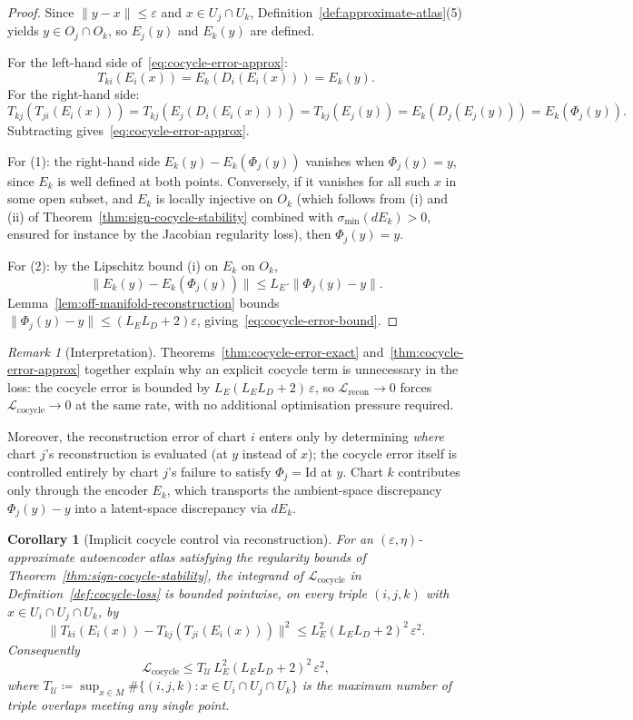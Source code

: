 \documentclass[11pt]{article}
\theoremstyle{plain}
\newtheorem{corollary}[theorem]{Corollary}
\theoremstyle{definition}
\theoremstyle{remark}
\newtheorem{remark}[theorem]{Remark}
\begin{document}
\begin{proof}
Since $\|y - x\| \leq \varepsilon$ and $x \in U_j \cap U_k$, Definition~\ref{def:approximate-atlas}(5) yields $y \in O_j \cap O_k$, so $E_j(y)$ and $E_k(y)$ are defined.

For the left-hand side of~\eqref{eq:cocycle-error-approx}:
\[
T_{ki}(E_i(x)) = E_k(D_i(E_i(x))) = E_k(y).
\]
For the right-hand side:
\[
T_{kj}(T_{ji}(E_i(x))) = T_{kj}(E_j(D_i(E_i(x)))) = T_{kj}(E_j(y)) = E_k(D_j(E_j(y))) = E_k(\Phi_j(y)).
\]
Subtracting gives~\eqref{eq:cocycle-error-approx}.

For (1): the right-hand side $E_k(y) - E_k(\Phi_j(y))$ vanishes when $\Phi_j(y) = y$, since $E_k$ is well defined at both points. Conversely, if it vanishes for all such $x$ in some open subset, and $E_k$ is locally injective on $O_k$ (which follows from (i) and (ii) of Theorem~\ref{thm:sign-cocycle-stability} combined with $\sigma_{\min}(d E_k) > 0$, ensured for instance by the Jacobian regularity loss), then $\Phi_j(y) = y$.

For (2): by the Lipschitz bound (i) on $E_k$ on $O_k$,
\[
\|E_k(y) - E_k(\Phi_j(y))\| \leq L_E \cdot \|\Phi_j(y) - y\|.
\]
Lemma~\ref{lem:off-manifold-reconstruction} bounds $\|\Phi_j(y) - y\| \leq (L_E L_D + 2)\varepsilon$, giving~\eqref{eq:cocycle-error-bound}.
\end{proof}

\begin{remark}[Interpretation]\label{rem:cocycle-interpretation}
Theorems~\ref{thm:cocycle-error-exact} and~\ref{thm:cocycle-error-approx} together explain why an explicit cocycle term is unnecessary in the loss: the cocycle error is bounded by $L_E (L_E L_D + 2)\,\varepsilon$, so $\mathcal{L}_{\mathrm{recon}} \to 0$ forces $\mathcal{L}_{\mathrm{cocycle}} \to 0$ at the same rate, with no additional optimisation pressure required.

Moreover, the reconstruction error of chart $i$ enters only by determining \emph{where} chart $j$'s reconstruction is evaluated (at $y$ instead of $x$); the cocycle error itself is controlled entirely by chart $j$'s failure to satisfy $\Phi_j = \mathrm{Id}$ at $y$. Chart $k$ contributes only through the encoder $E_k$, which transports the ambient-space discrepancy $\Phi_j(y) - y$ into a latent-space discrepancy via $d E_k$.
\end{remark}
\begin{corollary}[Implicit cocycle control via reconstruction]\label{cor:cocycle-from-recon}
For an $(\varepsilon, \eta)$-approximate autoencoder atlas satisfying the regularity bounds of Theorem~\ref{thm:sign-cocycle-stability}, the integrand of $\mathcal{L}_{\mathrm{cocycle}}$ in Definition~\ref{def:cocycle-loss} is bounded pointwise, on every triple $(i,j,k)$ with $x \in U_i \cap U_j \cap U_k$, by
\[
\bigl\|T_{ki}(E_i(x)) - T_{kj}(T_{ji}(E_i(x)))\bigr\|^2 \leq L_E^2 (L_E L_D + 2)^2\, \varepsilon^2.
\]
Consequently
\[
\mathcal{L}_{\mathrm{cocycle}} \leq T_{\mathcal{U}}\, L_E^2 (L_E L_D + 2)^2\, \varepsilon^2,
\]
where $T_{\mathcal{U}} \coloneqq \sup_{x \in M}\#\{(i,j,k) : x \in U_i \cap U_j \cap U_k\}$ is the maximum number of triple overlaps meeting any single point.
\end{corollary}
\end{document}
